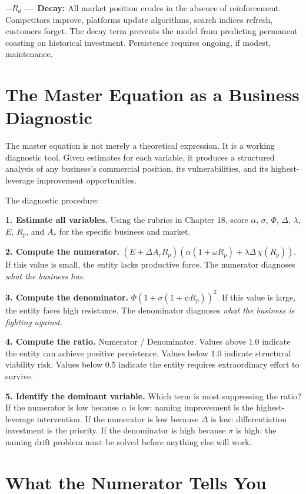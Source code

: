 \documentclass[12pt, openany]{book}
\theoremstyle{thmstyle}
\theoremstyle{defstyle}
\begin{document}
\textbf{$-R_d$ --- Decay:} All market position erodes in the absence of reinforcement. Competitors improve, platforms update algorithms, search indices refresh, customers forget. The decay term prevents the model from predicting permanent coasting on historical investment. Persistence requires ongoing, if modest, maintenance.

\section{The Master Equation as a Business Diagnostic}

The master equation is not merely a theoretical expression. It is a working diagnostic tool. Given estimates for each variable, it produces a structured analysis of any business's commercial position, its vulnerabilities, and its highest-leverage improvement opportunities.

The diagnostic procedure:

\textbf{1. Estimate all variables.} Using the rubrics in Chapter 18, score $\alpha$, $\sigma$, $\Phi$, $\Delta$, $\lambda$, $E$, $R_p$, and $A_r$ for the specific business and market.

\textbf{2. Compute the numerator.} $(E + \Delta A_r R_p)(\alpha(1+\omega R_p) + \lambda\Delta\,\chi(R_p))$. If this value is small, the entity lacks productive force. The numerator diagnoses \textit{what the business has}.

\textbf{3. Compute the denominator.} $\Phi(1+\sigma(1+\psi R_p))^2$. If this value is large, the entity faces high resistance. The denominator diagnoses \textit{what the business is fighting against}.

\textbf{4. Compute the ratio.} Numerator / Denominator. Values above 1.0 indicate the entity can achieve positive persistence. Values below 1.0 indicate structural viability risk. Values below 0.5 indicate the entity requires extraordinary effort to survive.

\textbf{5. Identify the dominant variable.} Which term is most suppressing the ratio? If the numerator is low because $\alpha$ is low: naming improvement is the highest-leverage intervention. If the numerator is low because $\Delta$ is low: differentiation investment is the priority. If the denominator is high because $\sigma$ is high: the naming drift problem must be solved before anything else will work.

\section{What the Numerator Tells You}
\end{document}
